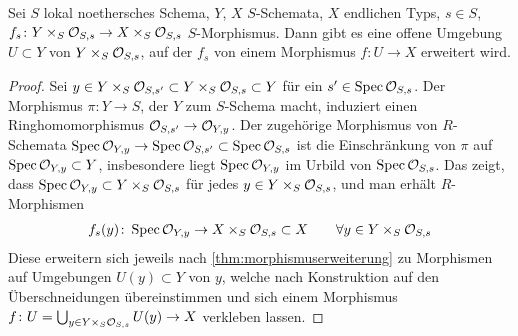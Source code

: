 \documentclass[german]{scrreprt}
\begin{document}
\begin{Korollar}\label{thm:allgmorphismuserweiterung}
  Sei $S$ lokal noethersches Schema, $Y$, $X$ $S$-Schemata, $X$
  endlichen Typs, $s\in S$,
  $f_s\colon Y\times_S\mathcal{O}_{S,s}\to X\times_S\mathcal{O}_{S,s}$ $S$-Morphismus.
  Dann gibt es eine offene Umgebung $U\subset Y$ von
  $Y\times_S\mathcal{O}_{S,s}$, auf der $f_s$ von einem Morphismus $f\colon
  U\to X$ erweitert wird.
  \begin{proof}
    Sei $y\in Y\times_S\mathcal{O}_{S,s'}\subset Y\times_S\mathcal{O}_{S,s}\subset Y$
    für ein $s'\in\operatorname{Spec}\mathcal{O}_{S,s}$. Der Morphismus $\pi\colon
    Y\to S$, der $Y$ zum $S$-Schema macht, induziert einen
    Ringhomomorphismus $\mathcal{O}_{S,s'}\to\mathcal{O}_{Y,y}$. Der zugehörige
    Morphismus von $R$-Schemata
    $\operatorname{Spec}\mathcal{O}_{Y,y}\to\operatorname{Spec}\mathcal{O}_{S,s'}\subset\operatorname{Spec}\mathcal{O}_{S,s}$ ist die
    Einschränkung von $\pi$ auf $\operatorname{Spec}\mathcal{O}_{Y,y}\subset Y$, insbesondere
    liegt $\operatorname{Spec}\mathcal{O}_{Y,y}$ im Urbild von $\operatorname{Spec}\mathcal{O}_{S,s}$.
    Das zeigt, dass $\operatorname{Spec}\mathcal{O}_{Y,y}\subset Y\times_S\mathcal{O}_{S,s}$ für jedes
    $y\in Y\times_S\mathcal{O}_{S,s}$, und man erhält $R$-Morphismen
    \begin{gather*}
      f_s(y)\colon \operatorname{Spec}\mathcal{O}_{Y,y}\to X\times_S\mathcal{O}_{S,s}\subset X
      \qquad \forall y \in Y\times_S\mathcal{O}_{S,s}
    \end{gather*}
    Diese erweitern sich jeweils nach
    \autoref{thm:morphismuserweiterung} zu Morphismen auf Umgebungen
    $U(y)\subset Y$ von $y$, welche nach Konstruktion auf den
    Überschneidungen übereinstimmen und sich einem Morphismus
    $f\colon U=\bigcup_{y\in Y\times_S\mathcal{O}_{S,s}} U(y)\to X$ verkleben
    lassen.
  \end{proof}
\end{Korollar}
\end{document}
